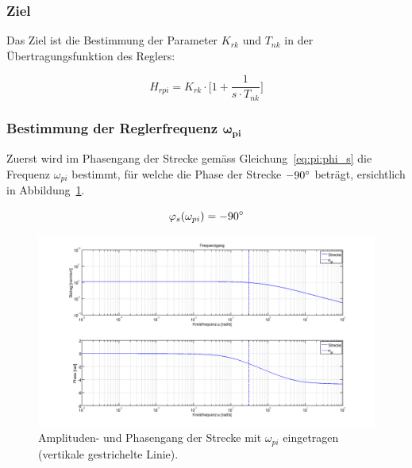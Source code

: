 \subsubsection*{Ziel}
Das  Ziel ist  die  Bestimmung  der Parameter  $K_{rk}$  und  $T_{nk}$ in  der
\"Ubertragungsfunktion des Reglers:

\begin{equation} \label{eq:pi:target}
    H_{rpi} = K_{rk} \cdot \biggl[ 1 + \frac{1}{s \cdot T_{nk}} \biggr]
\end{equation}


\subsubsection{Bestimmung der Reglerfrequenz $\mathbf{\boldsymbol{\omega}_{pi}}$}

Zuerst  wird im  Phasengang der  Strecke gem\"ass  Gleichung~\ref{eq:pi:phi_s}
die     Frequenz     $\omega_{pi}$      bestimmt,     f\"ur     welche     die
Phase     der    Strecke     $-90\degree$     betr\"agt,    ersichtlich     in
Abbildung~\ref{fig:pi:omega_pi}\footnotemark[4].

\begin{equation} \label{eq:pi:phi_s}
    \varphi_s(\omega_{pi}) = -90 \degree
\end{equation}


\begin{figure}[h! width=\pagewidth]
    \includegraphics[width=\textwidth]{images/piStreckeOmegaPI.png}
    \caption{%
        Amplituden- und  Phasengang der Strecke mit  $\omega_{pi}$ eingetragen
        (vertikale gestrichelte Linie).
    }
    \label{fig:pi:omega_pi}
\end{figure}

